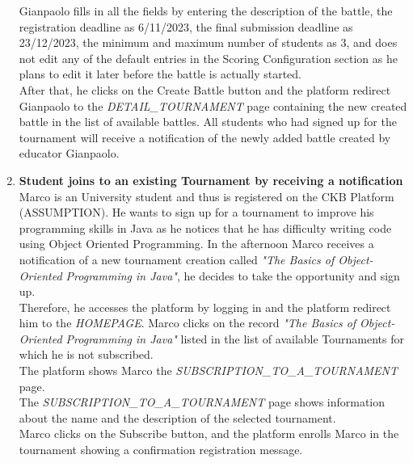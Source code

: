 \begin{enumerate}
		Gianpaolo fills in all the fields by entering the description of the battle, the registration deadline as 6/11/2023, the final submission deadline as 23/12/2023, the minimum
		and maximum number of students as 3, and does not edit any of the default entries in the Scoring Configuration section as he plans to edit it later before the battle is
		actually started.\\
		After that, he clicks on the Create Battle button and the platform redirect Gianpaolo to the \emph{DETAIL\_TOURNAMENT} page containing the new created battle in the list of available battles.
		All students who had signed up for the tournament will receive a notification of the newly added battle created by educator Gianpaolo.

		
		
		\item \textbf{Student joins to an existing Tournament by receiving a notification}\\
		Marco is an University student and thus is registered on the CKB Platform (ASSUMPTION). He wants to sign up for a tournament to improve his programming skills in Java as he notices that he has difficulty writing code using Object Oriented Programming. In the afternoon Marco receives a notification of a new tournament creation called \emph{"The Basics of Object-Oriented Programming in Java"}, he decides to take the opportunity and sign up.\\
Therefore, he accesses the platform by logging in and the platform redirect him to the \emph{HOMEPAGE}. Marco clicks on the record \emph{"The Basics of Object-Oriented Programming in Java"} listed in the list of available Tournaments for which he is not subscribed.\\
The platform shows Marco the \emph{SUBSCRIPTION\_TO\_A\_TOURNAMENT} page.\\
The \emph{SUBSCRIPTION\_TO\_A\_TOURNAMENT}  page shows information about the name and the description of the selected tournament. \\
Marco clicks on the Subscribe button, and the platform enrolls Marco in the tournament showing a confirmation registration message.


\end{enumerate}
